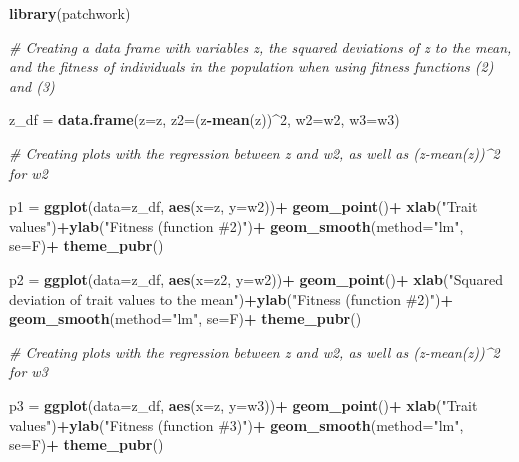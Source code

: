 \documentclass[
]{book}
\newenvironment{Shaded}{\begin{snugshade}}{\end{snugshade}}
\newcommand{\AttributeTok}[1]{\textcolor[rgb]{0.13,0.29,0.53}{#1}}
\newcommand{\CommentTok}[1]{\textcolor[rgb]{0.56,0.35,0.01}{\textit{#1}}}
\newcommand{\DecValTok}[1]{\textcolor[rgb]{0.00,0.00,0.81}{#1}}
\newcommand{\FunctionTok}[1]{\textcolor[rgb]{0.13,0.29,0.53}{\textbf{#1}}}
\newcommand{\NormalTok}[1]{#1}
\newcommand{\OtherTok}[1]{\textcolor[rgb]{0.56,0.35,0.01}{#1}}
\newcommand{\SpecialCharTok}[1]{\textcolor[rgb]{0.81,0.36,0.00}{\textbf{#1}}}
\newcommand{\StringTok}[1]{\textcolor[rgb]{0.31,0.60,0.02}{#1}}
\begin{document}
\begin{Shaded}
\begin{Highlighting}[]
\FunctionTok{library}\NormalTok{(patchwork)}

\CommentTok{\# Creating a data frame with variables z, the squared deviations of z to the mean, and the fitness of individuals in the population when using fitness functions (2) and (3)}

\NormalTok{z\_df }\OtherTok{=} \FunctionTok{data.frame}\NormalTok{(}\AttributeTok{z=}\NormalTok{z, }\AttributeTok{z2=}\NormalTok{(z}\SpecialCharTok{{-}}\FunctionTok{mean}\NormalTok{(z))}\SpecialCharTok{\^{}}\DecValTok{2}\NormalTok{, }\AttributeTok{w2=}\NormalTok{w2, }\AttributeTok{w3=}\NormalTok{w3)}

\CommentTok{\# Creating plots with the regression between z and w2, as well as (z{-}mean(z))\^{}2 for w2}

\NormalTok{p1 }\OtherTok{=} \FunctionTok{ggplot}\NormalTok{(}\AttributeTok{data=}\NormalTok{z\_df, }\FunctionTok{aes}\NormalTok{(}\AttributeTok{x=}\NormalTok{z, }\AttributeTok{y=}\NormalTok{w2))}\SpecialCharTok{+}
  \FunctionTok{geom\_point}\NormalTok{()}\SpecialCharTok{+}
  \FunctionTok{xlab}\NormalTok{(}\StringTok{"Trait values"}\NormalTok{)}\SpecialCharTok{+}\FunctionTok{ylab}\NormalTok{(}\StringTok{"Fitness (function \#2)"}\NormalTok{)}\SpecialCharTok{+}
  \FunctionTok{geom\_smooth}\NormalTok{(}\AttributeTok{method=}\StringTok{"lm"}\NormalTok{, }\AttributeTok{se=}\NormalTok{F)}\SpecialCharTok{+}
  \FunctionTok{theme\_pubr}\NormalTok{()}

\NormalTok{p2 }\OtherTok{=} \FunctionTok{ggplot}\NormalTok{(}\AttributeTok{data=}\NormalTok{z\_df, }\FunctionTok{aes}\NormalTok{(}\AttributeTok{x=}\NormalTok{z2, }\AttributeTok{y=}\NormalTok{w2))}\SpecialCharTok{+}
  \FunctionTok{geom\_point}\NormalTok{()}\SpecialCharTok{+}
  \FunctionTok{xlab}\NormalTok{(}\StringTok{"Squared deviation of trait values to the mean"}\NormalTok{)}\SpecialCharTok{+}\FunctionTok{ylab}\NormalTok{(}\StringTok{"Fitness (function \#2)"}\NormalTok{)}\SpecialCharTok{+}
  \FunctionTok{geom\_smooth}\NormalTok{(}\AttributeTok{method=}\StringTok{"lm"}\NormalTok{, }\AttributeTok{se=}\NormalTok{F)}\SpecialCharTok{+}
  \FunctionTok{theme\_pubr}\NormalTok{()}

\CommentTok{\# Creating plots with the regression between z and w2, as well as (z{-}mean(z))\^{}2 for w3}

\NormalTok{p3 }\OtherTok{=} \FunctionTok{ggplot}\NormalTok{(}\AttributeTok{data=}\NormalTok{z\_df, }\FunctionTok{aes}\NormalTok{(}\AttributeTok{x=}\NormalTok{z, }\AttributeTok{y=}\NormalTok{w3))}\SpecialCharTok{+}
  \FunctionTok{geom\_point}\NormalTok{()}\SpecialCharTok{+}
  \FunctionTok{xlab}\NormalTok{(}\StringTok{"Trait values"}\NormalTok{)}\SpecialCharTok{+}\FunctionTok{ylab}\NormalTok{(}\StringTok{"Fitness (function \#3)"}\NormalTok{)}\SpecialCharTok{+}
  \FunctionTok{geom\_smooth}\NormalTok{(}\AttributeTok{method=}\StringTok{"lm"}\NormalTok{, }\AttributeTok{se=}\NormalTok{F)}\SpecialCharTok{+}
  \FunctionTok{theme\_pubr}\NormalTok{()}


\end{Highlighting}
\end{Shaded}
\end{document}
